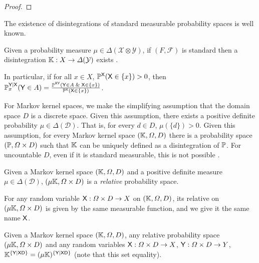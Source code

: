 \begin{proof}



\end{proof}

The existence of disintegrations of standard measurable probability spaces is well known.

\begin{theorem}\label{th:disintegration_exist}
Given a probability measure $\mu\in \Delta(\mathcal{X}\otimes \mathcal{Y})$, if $(F,\mathcal{F})$ is standard then a disintegration $\mathbb{K}:X\to \Delta(\mathcal{Y})$ exists \citep{cinlar_probability_2011}.
\end{theorem}

In particular, if for all $x\in X$, $\mathbb{P}^{\mathsf{X}}(\mathsf{X}\in\{x\})>0$, then $\prob{P}^{\RV{Y}|\RV{X}}_x(\RV{Y}\in A) = \frac{\prob{P}^{\RV{X}\RV{Y}}(\RV{Y}\in A \And \RV{X}\in \{x\})}{\prob{P}^{\RV{X}}(\RV{X}\in\{x\})}$.

For Markov kernel spaces, we make the simplifying assumption that the domain space $D$ is a discrete space. Given this assumption, there exists a positive definite probability $\mu\in \Delta(\mathcal{D})$. That is, for every $d\in D$, $\mu(\{d\})>0$. Given this assumption, for every Markov kernel space $(\mathbb{K},\Omega,D)$ there is a probability space $(\mathbb{P},\Omega\times D)$ such that $\mathbb{K}$ can be uniquely defined as a disintegration of $\mathbb{P}$. For uncountable $D$, even if it is standard measurable, this is not possible \citep{hajek_what_2003}.


\begin{definition}


Given a Markov kernel space $(\mathbb{K},\Omega,D)$ and a positive definite measure $\mu\in \Delta(\mathcal{D})$, $(\mu\mathbb{K},\Omega\times D)$ is a \emph{relative} probability space.

For any random variable $\mathsf{X}:\Omega\times D\to X$ on $(\mathbb{K},\Omega,D)$, its relative on $(\mu\mathbb{K},\Omega\times D)$ is given by the same measurable function, and we give it the same name $\mathsf{X}$.
\end{definition}


\begin{lemma}\label{lem:agree_disint}
Given a Markov kernel space $(\mathbb{K},\Omega,D)$, any relative probability space $(\mu\mathbb{K},\Omega\times D)$ and any random variables $\mathsf{X}:\Omega\times D\to X$, $\mathsf{Y}:\Omega\times D\to Y$, $\mathbb{K}^{\{\mathsf{Y}|\mathsf{X}\mathsf{D}\}}=(\mu\mathbb{K})^{\{\mathsf{Y}|\mathsf{X}\mathsf{D}\}}$ (note that this set equality).
\end{lemma}


